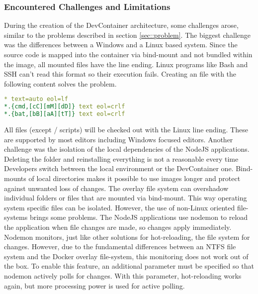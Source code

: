         \subsubsection{Encountered Challenges and Limitations}
        During the creation of the DevContainer architecture, some challenges arose, similar to the problems described in section \ref{sec::problem}. The biggest challenge was the differences between a Windows and a Linux based system. Since the source code is mapped into the container via bind-mount and not bundled within the image, all mounted files have the  line ending. Linux programs like Bash and SSH can't read this format so their execution fails. Creating an  file with the following content solves the problem.
        \begin{lstlisting}[language=yml,frame=none, numbers=none, backgroundcolor=\color{codebg}]
* text=auto eol=lf
*.{cmd,[cC][mM][dD]} text eol=crlf
*.{bat,[bB][aA][tT]} text eol=crlf
        \end{lstlisting}
        \vspace{-0.5cm}
        All files (except / scripts) will be checked out with the Linux  line ending. These are supported by most editors including Windows focused editors.\newline
        Another challenge was the isolation of the local dependencies of the NodeJS applications. Deleting the  folder and reinstalling everything is not a reasonable every time Developers switch between the local environment or the DevContainer one. Bind-mounts of local directories makes it possible to use images longer and protect against unwanted loss of changes. The overlay file system can overshadow individual folders or files that are mounted via bind-mount. This way operating system specific files can be isolated. However, the use of non-Linux oriented file-systems brings some problems. The NodeJS applications use nodemon to reload the application when file changes are made, so changes apply immediately. Nodemon monitors, just like other solutions for hot-reloading, the file system for changes. However, due to the fundamental differences between an NTFS file system and the Docker overlay file-system, this monitoring does not work out of the box. To enable this feature, an additional parameter must be specified so that nodemon actively polls for changes. With this parameter, hot-reloading works again, but more processing power is used for active polling.\newline
